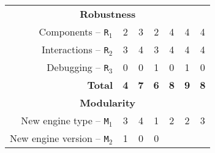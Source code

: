 \documentclass[preprint,3p,twocolumn]{elsarticle}
\begin{document}
\begin{table*}
\begin{tabular}{rcccccc}
\multicolumn{7}{c}{\cellcolor[HTML]{EEEEEE}\textbf{Robustness}}\\
Components  --   \texttt{R$_1$}      & \cellcolor[HTML]{99FF99}2
                                     & \cellcolor[HTML]{99DD99}3
                                     & \cellcolor[HTML]{99FF99}2
                                     & \cellcolor[HTML]{99AA99}4  
                                     & \cellcolor[HTML]{99AA99}4 
                                     & \cellcolor[HTML]{99AA99}4 \\
Interactions -- \texttt{R$_2$}       & \cellcolor[HTML]{99FF99}3    
                                     & \cellcolor[HTML]{99DD99}4
                                     & \cellcolor[HTML]{99DD99}3      
                                     & \cellcolor[HTML]{99AA99}4  
                                     & \cellcolor[HTML]{99AA99}4      
                                     & \cellcolor[HTML]{99AA99}4 \\
Debugging --    \texttt{R$_3$}       & \cellcolor[HTML]{99AA99}0          
                                     & \cellcolor[HTML]{99FF99}0
                                     & \cellcolor[HTML]{99AA99}1
                                     & \cellcolor[HTML]{99FF99}0
                                     & \cellcolor[HTML]{99AA99}1
                                     & \cellcolor[HTML]{99FF99}0 \\
\textbf{Total}                       & \cellcolor[HTML]{99FF99}\textbf{4}
                                     & \cellcolor[HTML]{99CC99}\textbf{7}
                                     & \cellcolor[HTML]{99CC99}\textbf{6}
                                     & \cellcolor[HTML]{99BB99}\textbf{8}
                                     & \cellcolor[HTML]{99AA99}\textbf{9}
                                     & \cellcolor[HTML]{99BB99}\textbf{8} \\
\multicolumn{7}{c}{\cellcolor[HTML]{EEEEEE}\textbf{Modularity}}\\
New engine type -- \texttt{M$_1$}    & \cellcolor[HTML]{99AA99}3
                                     & \cellcolor[HTML]{99DD99}4
                                     & \cellcolor[HTML]{99FF99}1
                                     & \cellcolor[HTML]{99DD99}2
                                     & \cellcolor[HTML]{99DD99}2
                                     & \cellcolor[HTML]{99AA99}3 \\
New engine version -- \texttt{M$_2$} & \cellcolor[HTML]{99AA99}1
                                     & \cellcolor[HTML]{99FF99}0
                                     & \cellcolor[HTML]{99FF99}0

\end{tabular}
\end{table*}
\end{document}
